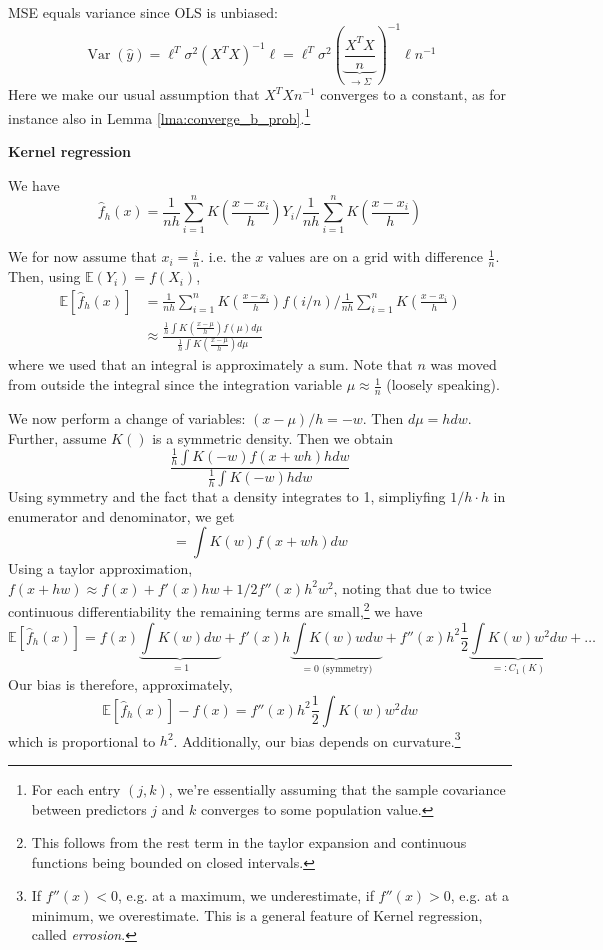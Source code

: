 \documentclass[11pt, %
	oneside, %
	english, %
	onehalfspacing, %
	]{article} %
\numberwithin{equation}{section}
\begin{document}
MSE equals variance since OLS is unbiased:
$$
\operatorname{Var} \left( \hat{y}\right) = \ell^T \sigma^2 (X^TX)^{-1}  \ell = \ell^T \sigma^2  \left( \underbrace{ \frac{X^TX}{n}}_{ \to \Sigma } \right)^{-1}  \ell n^{-1}
$$
Here we make our usual assumption that $X^TX n^{-1}$ converges to a constant, as for instance also in Lemma \ref{lma:converge_b_prob}.\footnote{For each entry $(j,k)$, we're essentially assuming that the sample covariance between predictors $j$ and $k$ converges to some population value.}

\noindent\textbf{Kernel regression}

We have
$$
\hat{f}_h (x) = \frac{1}{nh} \sum_{ i =1 }^{ n } K \left( \frac{x-x_i}{h} \right) Y_i \Bigg/ \frac{1}{nh} \sum_{ i = 1 }^{ n } K\left(  \frac{x-x_i}{h} \right)
$$

We for now assume that $x_i = \frac{i}{n}$. i.e. the $x$ values are on a grid with difference $\frac{1}{n}$. Then, using $\mathbb{E}(Y_i) = f(X_i)$,
$$
\begin{aligned}
\mathbb{E} \left[ \hat{f}_h(x)\right] &= \frac{1}{nh} \sum_{ i =1 }^{ n } K \left( \frac{x-x_i}{h} \right) f( i / n) \Bigg/ \frac{1}{nh} \sum_{ i = 1 }^{ n } K\left(  \frac{x-x_i}{h} \right) \\
& \approx \frac{\frac{1}{h} \int K\left( \frac{x- \mu}{h} \right) f(\mu) d \mu}{\frac{1}{h} \int K\left( \frac{x- \mu}{h} \right) d \mu}
\end{aligned}
$$
where we used that an integral is approximately a sum. Note that $n$ was moved from outside the integral since the integration variable $\mu \approx \frac{1}{n}$ (loosely speaking).

We now perform a change of variables: $(x- \mu) / h = -w$. Then $d \mu = h d w$.  Further, assume $K()$ is a symmetric density. Then we obtain
$$
\frac{\frac{1}{h}\int K(-w) f(x+wh) h dw}{\frac{1}{h} \int K(-w) h dw}
$$
Using symmetry and the fact that a density integrates to 1, simpliyfing $1/h \cdot h$ in enumerator and denominator,  we get
$$
=\int K(w) f(x+wh) dw
$$
Using a taylor approximation, $f(x + hw) \approx f(x) +f'(x) hw + 1/2 f''(x) h^2 w^2$,  noting that due to twice continuous differentiability the remaining terms are small,\footnote{This follows from the rest term in the taylor expansion and continuous functions being bounded on closed intervals.} we have
$$
\mathbb{E} \left[ \hat{f}_h(x)\right] =f(x) \underbrace{ \int K(w) dw }_{ =1 } + f'(x) h\underbrace{ \int K(w) w dw }_{ = 0 \text{ (symmetry)} } + f''(x) h^2 \frac{1}{2} \underbrace{ \int K(w) w^2 dw }_{ =:C_1(K) } + \dots
$$
Our bias is therefore, approximately,
\begin{equation*}
    \mathbb{E} \left[ \hat{f}_h(x)\right] - f(x) =  f''(x) h^2 \frac{1}{2} \int K(w) w^2 dw
\end{equation*}
which is proportional to $h^2$. Additionally, our bias depends on curvature.\footnote{If $f''(x) < 0$, e.g. at a maximum, we underestimate, if $f''(x) > 0$, e.g. at a minimum, we overestimate. This is a general feature of Kernel regression, called \emph{errosion}.}
\end{document}
